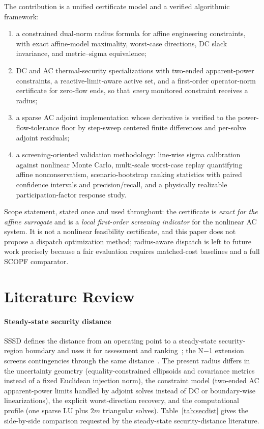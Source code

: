 \documentclass[11pt]{article}
\begin{document}
The contribution is a unified certificate model and a verified algorithmic
framework:
\begin{enumerate}[leftmargin=*]
  \item a constrained dual-norm radius formula for affine engineering
        constraints, with exact affine-model maximality, worst-case
        directions, DC slack invariance, and metric--sigma equivalence;
  \item DC and AC thermal-security specializations with two-ended
        apparent-power constraints, a reactive-limit-aware active set, and a
        first-order operator-norm certificate for zero-flow ends, so that
        \emph{every} monitored constraint receives a radius;
  \item a sparse AC adjoint implementation whose derivative is verified to
        the power-flow-tolerance floor by step-sweep centered finite
        differences and per-solve adjoint residuals;
  \item a screening-oriented validation methodology: line-wise sigma
        calibration against nonlinear Monte Carlo, multi-scale worst-case
        replay quantifying affine nonconservatism, scenario-bootstrap
        ranking statistics with paired confidence intervals and
        precision/recall, and a physically realizable participation-factor
        response study.
\end{enumerate}

Scope statement, stated once and used throughout: the certificate is
\emph{exact for the affine surrogate} and is a \emph{local first-order
screening indicator} for the nonlinear AC system.  It is not a nonlinear
feasibility certificate, and this paper does not propose a dispatch
optimization method; radius-aware dispatch is left to future work precisely
because a fair evaluation requires matched-cost baselines and a full SCOPF
comparator.

\section{Literature Review}
\label{sec:literature}

\paragraph{Steady-state security distance}
SSSD defines the distance from an operating point to a steady-state
security-region boundary and uses it for assessment and
ranking~\citep{ChenChenXiaKang2013,ChenChenXia2015Concept}; the N$-$1
extension screens contingencies through the same
distance~\citep{ChenEtAl2015N1}.  The present radius differs in the
uncertainty geometry (equality-constrained ellipsoids and covariance metrics
instead of a fixed Euclidean injection norm), the constraint model
(two-ended AC apparent-power limits handled by adjoint solves instead of
DC or boundary-wise linearizations), the explicit worst-direction recovery,
and the computational profile (one sparse LU plus $2m$ triangular solves).
Table~\ref{tab:secdist} gives the side-by-side comparison requested by the
steady-state security-distance literature.
\end{document}
